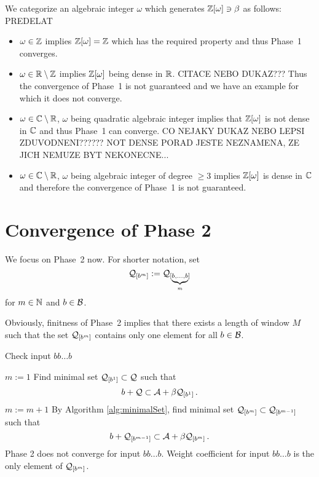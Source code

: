 We categorize an algebraic integer $\omega$ which generates $\mathbb{Z}[\omega] \ni \beta$ as follows:
PREDELAT
\begin{itemize}
    \item $\omega \in \mathbb{Z}$ implies $\mathbb{Z}[\omega]=\mathbb{Z}$ which has the required property and thus Phase~1 converges.
    \item $\omega \in \mathbb{R}\setminus\mathbb{Z}$ implies $\mathbb{Z}[\omega]$ being dense in $\mathbb{R}$. CITACE NEBO DUKAZ??? Thus the convergence of Phase~1 is not guaranteed and we have an example for which it does not converge.
    \item $\omega \in \mathbb{C}\setminus\mathbb{R}$, $\omega$ being quadratic algebraic integer implies that $\mathbb{Z}[\omega]$ is not dense in $\mathbb{C}$ and thus Phase~1 can converge. CO NEJAKY DUKAZ NEBO LEPSI ZDUVODNENI?????? NOT DENSE PORAD JESTE NEZNAMENA, ZE JICH NEMUZE BYT NEKONECNE...
    \item $\omega \in \mathbb{C}\setminus\mathbb{R}$, $\omega$ being algebraic integer of degree $\geq 3$ implies $\mathbb{Z}[\omega]$ is  dense in $\mathbb{C}$ and therefore the convergence of Phase~1 is not guaranteed.
\end{itemize}

\section{Convergence of Phase 2}
\label{sec:convergencePhase2}
We focus on Phase~2 now. For shorter notation, set 
$$
\mathcal{Q}_{[b^{m}]}:=\mathcal{Q}_{[\underbrace{\scriptstyle b,\dots,b}_m]}
$$ for $m \in \mathbb{N}$ and $b\in\mathcal{B}$.

Obviously, finitness of Phase~2 implies that there exists a length of window $M$ such that the set $\mathcal{Q}_{[b^{m}]}$ contains only one element for all $b\in\mathcal{B}$. 

\begin{algorithm}
  \caption{Check input $bb\dots b$}
    \label{alg:oneletterSets}
  \begin{algorithmic}[1]
    \STATE $m:=1$
    \STATE Find minimal set $\mathcal{Q}_{[b^{1}]} \subset \mathcal{Q}$ such that
      $$
      b + \mathcal{Q} \subset \mathcal{A} + \beta \mathcal{Q}_{[b^{1}]}\,.
      $$
      \vspace{-20pt}
        \STATE $m:= m +1$
        \STATE By Algorithm \ref{alg:minimalSet}, find minimal set $\mathcal{Q}_{[b^{m}]} \subset \mathcal{Q}_{[b^{m-1}]}$ such that
          $$
          b + \mathcal{Q}_{[b^{m-1}]} \subset \mathcal{A} + \beta \mathcal{Q}_{[b^{m}]}\,.
          $$  
          \vspace{-20pt}
            \RETURN Phase 2 does not converge for input $bb\dots b$.
        \ENDIF
    \ENDWHILE  
    \RETURN Weight coefficient for input $bb\dots b$ is the only element of $\mathcal{Q}_{[b^{m}]}$.
  \end{algorithmic}
\end{algorithm}

